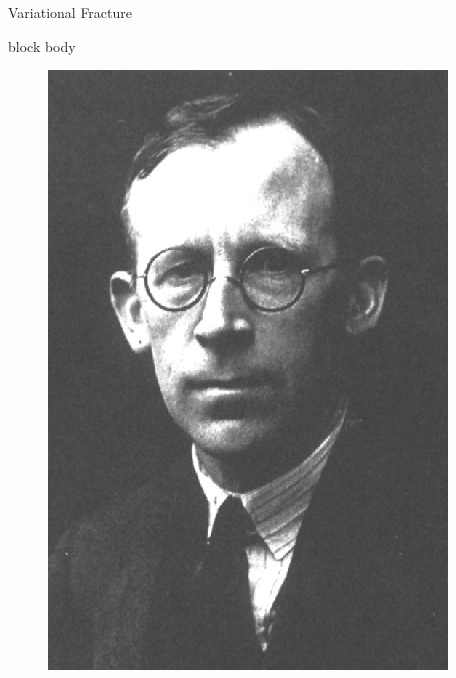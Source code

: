 \documentclass[aspectratio=169,xcolor=dvipsnames,11pt]{beamer}
\begin{document}
\begin{frame}{Variational Fracture}
\begin{minipage}{0.53\textwidth}
{\begin{beamercolorbox}[rounded=true, shadow=true, wd=\textwidth]{block body}
      \end{beamercolorbox}}
    \end{minipage}\hspace*{1.75cm}
    \begin{minipage}{0.3\textwidth}
  \centering
 \begin{figure}
  \centering\vspace{1ex}
   \begin{minipage}[b]{0.4\textwidth}
    \includegraphics[width=\linewidth]{figures/griffith.jpg}
  \end{minipage}
  \hfill
  \begin{minipage}[b]{0.4\textwidth}

\end{minipage}
\end{figure}
\end{minipage}
\end{frame}
\end{document}
